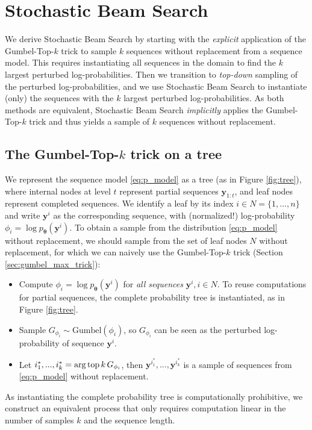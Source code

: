 \section{Stochastic Beam Search}
We derive Stochastic Beam Search by starting with the \emph{explicit} application of the Gumbel-Top-$k$ trick to sample $k$ sequences without replacement from a sequence model. This requires instantiating all sequences in the domain to find the $k$ largest perturbed log-probabilities. Then we transition to \emph{top-down} sampling of the perturbed log-probabilities, and we use Stochastic Beam Search to instantiate (only) the sequences with the $k$ largest perturbed log-probabilities. As both methods are equivalent, Stochastic Beam Search \emph{implicitly} applies the Gumbel-Top-$k$ trick and thus yields a sample of $k$ sequences without replacement.

\subsection{The Gumbel-Top-$k$ trick on a tree}
We represent the sequence model \eqref{eq:p_model} as a tree (as in Figure \ref{fig:tree}), where internal nodes at level $t$ represent partial sequences $\bm{y}_{1:t}$, and leaf nodes represent completed sequences. We identify a leaf by its index $i \in N = \{1, ..., n\}$ and write $\bm{y}^{i}$ as the corresponding sequence, with (normalized!) log-probability $\phi_i = \log p_{\bm{\theta}}(\bm{y}^{i})$. To obtain a sample from the distribution \eqref{eq:p_model} without replacement, we should sample from the set of leaf nodes $N$ without replacement, for which we can naively use the Gumbel-Top-$k$ trick (Section \ref{sec:gumbel_max_trick}):
\begin{itemize}
  \setlength\itemsep{\itemmargin}
    \item Compute $\phi_i = \log p_{\bm{\theta}}(\bm{y}^{i})$ for \emph{all sequences} $\bm{y}^{i}, i \in N$. To reuse computations for partial sequences, the complete probability tree is instantiated, as in Figure \ref{fig:tree}.
    \item Sample $G_{\phi_i} \sim \text{Gumbel}(\phi_i)$, so $G_{\phi_i}$ can be seen as the perturbed log-probability of sequence $\bm{y}^i$.
    \item Let $i^*_1, ..., i^*_k = \operatorname*{arg\,top} k \, { G_{\phi_i} }$, then $\bm{y}^{i^*_1}, ..., \bm{y}^{i^*_k}$ is a sample of sequences from \eqref{eq:p_model} without replacement.
\end{itemize}
As instantiating the complete probability tree is computationally prohibitive, we construct an equivalent process that only requires computation linear in the number of samples $k$ and the sequence length.

